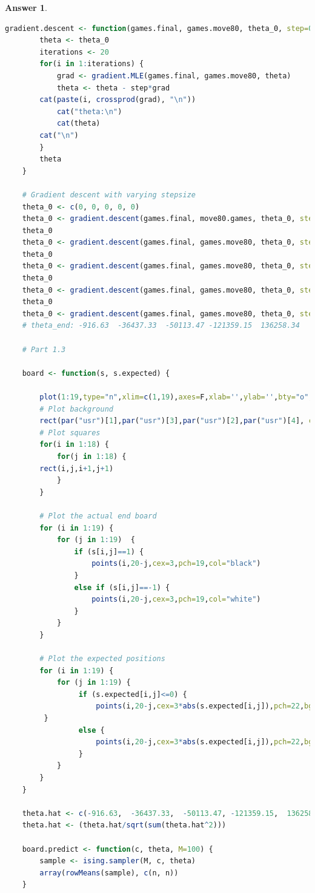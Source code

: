 \documentclass[12pt]{article}
\theoremstyle{colon}
\newtheorem*{answer}{Answer}
\begin{document}
\begin{answer}
\begin{lstlisting}[language=R, basicstyle=\scriptsize, breaklines=true]
    gradient.descent <- function(games.final, games.move80, theta_0, step=0.001) {
        theta <- theta_0
        iterations <- 20
        for(i in 1:iterations) {
            grad <- gradient.MLE(games.final, games.move80, theta)
            theta <- theta - step*grad
        cat(paste(i, crossprod(grad), "\n"))
            cat("theta:\n")
            cat(theta)
        cat("\n")
        }
        theta
    }

    # Gradient descent with varying stepsize
    theta_0 <- c(0, 0, 0, 0, 0)
    theta_0 <- gradient.descent(games.final, move80.games, theta_0, step=10)
    theta_0
    theta_0 <- gradient.descent(games.final, games.move80, theta_0, step=1)
    theta_0
    theta_0 <- gradient.descent(games.final, games.move80, theta_0, step=0.1)
    theta_0
    theta_0 <- gradient.descent(games.final, games.move80, theta_0, step=0.01)
    theta_0
    theta_0 <- gradient.descent(games.final, games.move80, theta_0, step=0.001)
    # theta_end: -916.63  -36437.33  -50113.47 -121359.15  136258.34

    # Part 1.3

    board <- function(s, s.expected) {

        plot(1:19,type="n",xlim=c(1,19),axes=F,xlab='',ylab='',bty="o",lab=c(19,19,1))
        # Plot background
        rect(par("usr")[1],par("usr")[3],par("usr")[2],par("usr")[4], col="gray")
        # Plot squares
        for(i in 1:18) {
            for(j in 1:18) {
        rect(i,j,i+1,j+1)
            }
        }

        # Plot the actual end board
        for (i in 1:19) {
            for (j in 1:19)  {
                if (s[i,j]==1) {
                    points(i,20-j,cex=3,pch=19,col="black")
                }
                else if (s[i,j]==-1) {
                    points(i,20-j,cex=3,pch=19,col="white")
                }
            }
        }

        # Plot the expected positions
        for (i in 1:19) {
            for (j in 1:19) {
                 if (s.expected[i,j]<=0) {
                     points(i,20-j,cex=3*abs(s.expected[i,j]),pch=22,bg="white",col="white")
         }
                 else {
                     points(i,20-j,cex=3*abs(s.expected[i,j]),pch=22,bg="black",col="black")
                 }
            }
        }
    }

    theta.hat <- c(-916.63,  -36437.33,  -50113.47, -121359.15,  136258.34)
    theta.hat <- (theta.hat/sqrt(sum(theta.hat^2)))

    board.predict <- function(c, theta, M=100) {
        sample <- ising.sampler(M, c, theta)
        array(rowMeans(sample), c(n, n))
    }


\end{lstlisting}
\end{answer}
\end{document}
